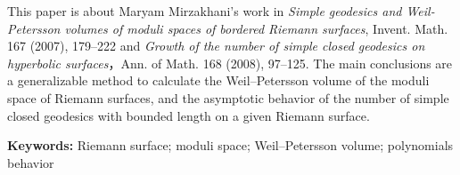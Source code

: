 This paper is about Maryam Mirzakhani’s work in \emph{Simple geodesics and Weil-Petersson volumes of moduli spaces of bordered Riemann surfaces}, Invent. Math. 167 (2007), 179–222 and  \emph{Growth of the number of simple closed geodesics on hyperbolic surfaces}，Ann. of Math. 168 (2008), 97–125. The main conclusions are a generalizable method to calculate the Weil--Petersson volume of the moduli space of Riemann surfaces, and the asymptotic behavior of the number of simple closed geodesics with bounded length   on a given Riemann surface.

\bigskip

\noindent
\textbf{Keywords:}
Riemann surface; moduli space; Weil--Petersson volume; polynomials behavior
